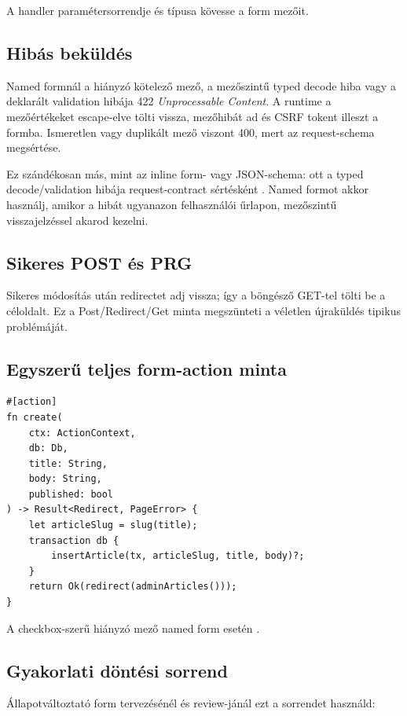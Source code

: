 A handler paramétersorrendje és típusa kövesse a form mezőit.

\subsection*{Hibás beküldés}

Named formnál a hiányzó kötelező mező, a mezőszintű typed decode hiba vagy a deklarált validation hibája 422 \emph{Unprocessable Content}. A runtime a mezőértékeket escape-elve tölti vissza, mezőhibát ad és CSRF tokent illeszt a formba. Ismeretlen vagy duplikált mező viszont 400, mert az request-schema megsértése.

Ez szándékosan más, mint az inline form- vagy JSON-schema: ott a typed decode/validation hibája request-contract sértésként . Named formot akkor használj, amikor a hibát ugyanazon felhasználói űrlapon, mezőszintű visszajelzéssel akarod kezelni.

\subsection*{Sikeres POST és PRG}

Sikeres módosítás után redirectet adj vissza; így a böngésző GET-tel tölti be a céloldalt. Ez a Post/Redirect/Get minta megszünteti a véletlen újraküldés tipikus problémáját.

\subsection*{Egyszerű teljes form-action minta}

\begin{lstlisting}[language=Velran]
#[action]
fn create(
    ctx: ActionContext,
    db: Db,
    title: String,
    body: String,
    published: bool
) -> Result<Redirect, PageError> {
    let articleSlug = slug(title);
    transaction db {
        insertArticle(tx, articleSlug, title, body)?;
    }
    return Ok(redirect(adminArticles()));
}
\end{lstlisting}

A checkbox-szerű hiányzó  mező named form esetén .

\subsection*{Gyakorlati döntési sorrend}

Állapotváltoztató form tervezésénél és review-jánál ezt a sorrendet használd:

